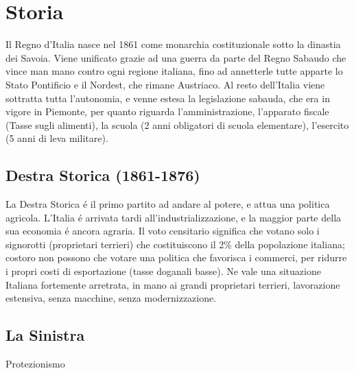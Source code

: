 \documentclass{article}
\title{\jobname}
\author{Eugenio Animali}
\begin{document}
\maketitle

\section{Storia}
Il Regno d'Italia nasce nel 1861 come monarchia costituzionale sotto la dinastia dei Savoia. Viene unificato grazie ad una guerra da parte del Regno Sabaudo che vince man mano contro ogni regione italiana, fino ad annetterle tutte apparte lo Stato Pontificio e il Nordest, che rimane Austriaco. Al resto dell'Italia viene sottratta tutta l'autonomia, e venne estesa la legislazione sabauda, che era in vigore in Piemonte, per quanto riguarda l'amministrazione, l'apparato fiscale (Tasse sugli alimenti), la scuola (2 anni obligatori di scuola elementare), l'esercito (5 anni di leva militare).
\subsection{Destra Storica (1861-1876)}
La Destra Storica é il primo partito ad andare al potere, e attua una politica agricola. L'Italia é arrivata tardi all'industrializzazione, e la maggior parte della sua economia é ancora agraria. Il voto censitario significa che votano solo i signorotti (proprietari terrieri) che costituiscono il 2\% della popolazione italiana; costoro non possono che votare una politica che favorisca i commerci, per ridurre i propri costi di esportazione (tasse doganali basse). Ne vale una situazione Italiana fortemente arretrata, in mano ai grandi proprietari terrieri, lavorazione estensiva, senza macchine, senza modernizzazione.
\subsection{La Sinistra}
Protezionismo 
\end{document}
